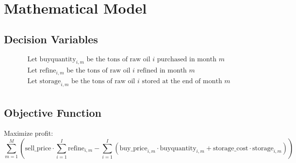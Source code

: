 \documentclass{article}
\begin{document}
\section*{Mathematical Model}

\subsection*{Decision Variables}
\begin{align*}
& \text{Let } \text{buyquantity}_{i, m} \text{ be the tons of raw oil } i \text{ purchased in month } m \\
& \text{Let } \text{refine}_{i, m} \text{ be the tons of raw oil } i \text{ refined in month } m \\
& \text{Let } \text{storage}_{i, m} \text{ be the tons of raw oil } i \text{ stored at the end of month } m \\
\end{align*}

\subsection*{Objective Function}
Maximize profit:
\[
\sum_{m=1}^{M} \left( \text{sell\_price} \cdot \sum_{i=1}^{I} \text{refine}_{i, m} - \sum_{i=1}^{I} \left( \text{buy\_price}_{i, m} \cdot \text{buyquantity}_{i, m} + \text{storage\_cost} \cdot \text{storage}_{i, m} \right) \right)
\]
\end{document}
